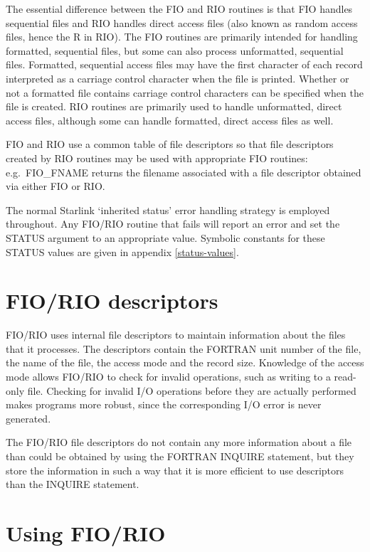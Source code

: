 The essential difference between the FIO and RIO routines is that FIO handles
sequential files and RIO handles direct access files (also known as random
access files, hence the R in RIO). The FIO routines are primarily intended for
handling formatted, sequential files, but some can also process unformatted,
sequential files. Formatted, sequential access files may have the first
character of each record interpreted as a carriage control character when the
file is printed. Whether or not a formatted file contains carriage control
characters can be specified when the file is created. RIO routines are
primarily used to handle unformatted, direct access files, although some can
handle formatted, direct access files as well.

FIO and RIO use a common table of file descriptors so that file descriptors
created by RIO routines may be used with appropriate FIO routines: e.g.\
FIO\_FNAME returns the filename associated with a file descriptor obtained via
either FIO or RIO.

The normal Starlink `inherited status' error handling strategy is employed
throughout. Any FIO/RIO routine that fails will report an error and set the
STATUS argument to an appropriate value. Symbolic constants for these STATUS
values are given in appendix \ref{status-values}.

\section{FIO/RIO descriptors}

FIO/RIO uses internal file descriptors to maintain information about the files
that it processes. The descriptors contain the FORTRAN unit number of the file,
the name of the file, the access mode and the record size. Knowledge of the
access mode allows FIO/RIO to check for invalid operations, such as writing to
a read-only file. Checking for invalid I/O operations before they are actually
performed makes programs more robust, since the corresponding I/O error is
never generated.

The FIO/RIO file descriptors do not contain any more information about a file
than could be obtained by using the FORTRAN INQUIRE statement, but they store
the information in such a way that it is more efficient to use descriptors than
the INQUIRE statement.

\section{Using FIO/RIO}

